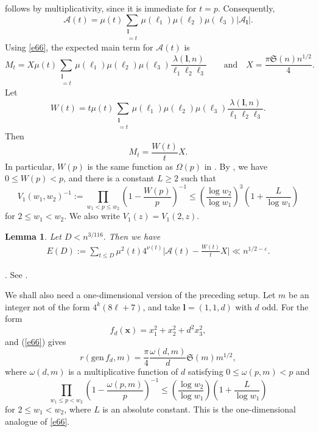 \documentclass[12pt,a4paper,reqno]{amsart}
\numberwithin{equation}{section}
\theoremstyle{plain}
\newtheorem{lemma}{Lemma}
\theoremstyle{definition}
\begin{document}
follows by multiplicativity, since it is immediate for $t=p$. Consequently,
\begin{equation}\label{e:A_t}
\mathcal A(t)=
\mu(t)\sum_{\substack{\mathbf l\\ [\ell_1,\ell_2,\ell_3]=t}}
\mu(\ell_1)\mu(\ell_2)\mu(\ell_3)|\mathcal A_{\mathbf l}|.
\end{equation}
Using \eqref{e66}, the expected main term for $\mathcal A(t)$ is
\[
M_t=X\mu(t)\sum_{\substack{\mathbf l\\ [\ell_1,\ell_2,\ell_3]=t}}
\mu(\ell_1)\mu(\ell_2)\mu(\ell_3)
\frac{\lambda(\mathbf l,n)}{\ell_1\ell_2\ell_3}
\qquad \text{and} \quad
X=\frac{\pi\mathfrak S(n)n^{1/2}}4.
\]
Let
\begin{equation}\label{e46}
W(t)=t\mu(t)\sum_{\substack{\mathbf l\\ [\ell_1,\ell_2,\ell_3]=t}}
\mu(\ell_1)\mu(\ell_2)\mu(\ell_3)
\frac{\lambda(\mathbf l,n)}{\ell_1\ell_2\ell_3}.
\end{equation}
Then
\[
M_t=\frac{W(t)}tX.
\]
In particular, $W(p)$ is the same function as $\Omega(p)$ in \cite[(3.11)]{Lv}. By \cite[(3.13)]{Lv}, we have $0\leq W(p)<p$, and there is a constant $L\geq2$ such that
\begin{equation}\label{e:V1}
V_1(w_1,w_2)^{-1}:=
\prod_{w_1<p\leq w_2}\left(1-\frac{W(p)}p\right)^{-1}
\leq
\left(\frac{\log w_2}{\log w_1}\right)^3
\left(1+\frac L{\log w_1}\right)
\end{equation}
for $2\leq w_1<w_2$. We also write $V_1(z)=V_1(2,z)$.

\begin{lemma}\label{pro1}
Let $D< n^{3/116}.$ Then we have
\begin{align*}
E(D):=\sum_{t\leq D}\mu^{2}(t)4^{\nu(t)}\Big|\mathcal{A}(t)-\frac{W(t)}{t} X\Big|\ll n^{1/2 - \varepsilon}.
\end{align*}
\end{lemma}

. See \cite[Lemma 17]{Wa}.


We shall also need a one-dimensional version of the preceding setup. Let $m$ be an integer not of the form $4^k(8\ell+7)$, and take $\mathbf l=(1,1,d)$ with $d$ odd. For the form
\[
f_d(\mathbf x)=x_1^2+x_2^2+d^2x_3^2,
\]
and (\ref{e66}) gives
\begin{equation}\label{e67}
r(\mathrm{gen}\,f_d,m)=\frac{\pi}{4}\frac{\omega(d,m)}{d}\mathfrak S(m)m^{1/2},
\end{equation}
where $\omega(d,m)$ is a multiplicative function of $d$ satisfying $0\leq \omega(p,m)<p$ and
\begin{equation}\label{e71}
\prod_{w_1\leq p<w_2}\left(1-\frac{\omega(p,m)}p\right)^{-1}
\leq
\left(\frac{\log w_2}{\log w_1}\right)
\left(1+\frac L{\log w_1}\right)
\end{equation}
for $2\leq w_1<w_2$, where $L$ is an absolute constant. This is the one-dimensional analogue of \eqref{e66}.
\end{document}
